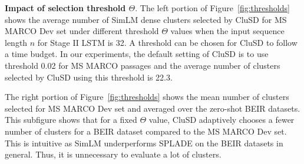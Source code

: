 \label{sect:threshold}
\textbf{Impact of  selection threshold $\Theta$}.
The left portion of Figure~\ref{fig:thresholds} shows
the average number of SimLM dense clusters selected by CluSD for MS MARCO Dev set under different threshold $\Theta$ values  when
the input sequence length $n$ for Stage II LSTM is 32.
A threshold can be chosen for CluSD to follow a  time budget. 
In our experiments,  the default setting of
CluSD is to use threshold 0.02  for MS MARCO passages and the average number of clusters selected by CluSD using this threshold is 22.3.

The right portion of Figure~\ref{fig:thresholds} 
shows  the mean number of clusters selected for MS MARCO Dev set and averaged over 
the zero-shot BEIR datasets.
This subfigure shows that for a fixed $\Theta$ value, CluSD  adaptively chooses a fewer number of clusters for a
BEIR dataset compared to the MS MARCO Dev set.  
This is intuitive as
SimLM underperforms SPLADE on the BEIR datasets in general. Thus, it is unnecessary to evaluate a lot of clusters. 

